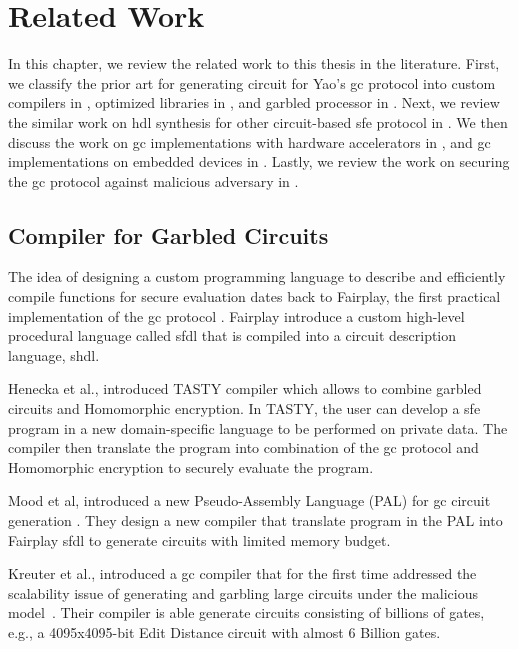 \chapter{Related Work}\label{chap:related}
In this chapter, we review the related work to this thesis in the literature.
First, we classify the prior art for generating circuit for Yao's \acrfull{gc} protocol into custom compilers in , optimized libraries in , and garbled processor in .
Next, we review the similar work on \acrshort{hdl} synthesis for other circuit-based \acrshort{sfe} protocol in .
We then discuss the work on \acrshort{gc} implementations with hardware accelerators in , and \acrshort{gc} implementations on embedded devices in .
Lastly, we review the work on securing the \acrshort{gc} protocol against malicious adversary in .

\section{Compiler for Garbled Circuits}\label{sec:related-compiler}
The idea of designing a custom programming language to describe and efficiently compile functions for secure evaluation dates back to Fairplay, the first practical implementation of the \acrshort{gc} protocol \cite{malkhi2004fairplay}.
Fairplay introduce a custom high-level procedural language called \acrfull{sfdl} that is compiled into a circuit description language, \acrfull{shdl}.

Henecka et al., introduced TASTY compiler \cite{henecka2010tasty} which allows to combine garbled circuits and Homomorphic encryption.
In TASTY, the user can develop a \acrshort{sfe} program in a new domain-specific language to be performed on private data.
The compiler then translate the program into combination of the \acrshort{gc} protocol and Homomorphic encryption to securely evaluate the program.

Mood et al, introduced a new Pseudo-Assembly Language (PAL) for \acrshort{gc} circuit generation \cite{mood2012memory}.
They design a new compiler that translate program in the PAL into Fairplay \acrshort{sfdl} to generate circuits with limited memory budget.

Kreuter et al., introduced a \acrshort{gc} compiler that for the first time addressed the scalability issue of generating and garbling large circuits under the malicious model~\cite{kreuter2012billion}.
Their compiler is able generate circuits consisting of billions of gates, e.g., a 4095x4095-bit Edit Distance circuit with almost 6 Billion gates.

